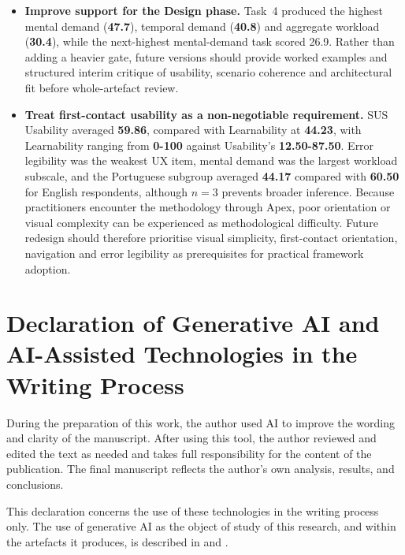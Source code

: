 \begin{itemize}[leftmargin=0.6cm, itemsep=0.4em]
\item \textbf{Improve support for the Design phase.} Task~4 produced the highest mental demand (\textbf{47.7}), temporal demand (\textbf{40.8}) and aggregate workload (\textbf{30.4}), while the next-highest mental-demand task scored 26.9. Rather than adding a heavier gate, future versions should provide worked examples and structured interim critique of usability, scenario coherence and architectural fit before whole-artefact review.

\item \textbf{Treat first-contact usability as a non-negotiable requirement.} \ac{SUS} Usability averaged \textbf{59.86}, compared with Learnability at \textbf{44.23}, with Learnability ranging from \textbf{0-100} against Usability's \textbf{12.50-87.50}. Error legibility was the weakest \ac{UX} item, mental demand was the largest workload subscale, and the Portuguese subgroup averaged \textbf{44.17} compared with \textbf{60.50} for English respondents, although $n=3$ prevents broader inference. Because practitioners encounter the methodology through Apex, poor orientation or visual complexity can be experienced as methodological difficulty. Future redesign should therefore prioritise visual simplicity, first-contact orientation, navigation and error legibility as prerequisites for practical framework adoption.

\end{itemize}

\clearpage
\section*{Declaration of Generative AI and AI-Assisted Technologies in the Writing Process}

During the preparation of this work, the author used AI to improve the wording and clarity of the manuscript. After using this tool, the author reviewed and edited the text as needed and takes full responsibility for the content of the publication. The final manuscript reflects the author's own analysis, results, and conclusions.

This declaration concerns the use of these technologies in the writing process only. The use of generative AI as the object of study of this research, and within the artefacts it produces, is described in  and .
